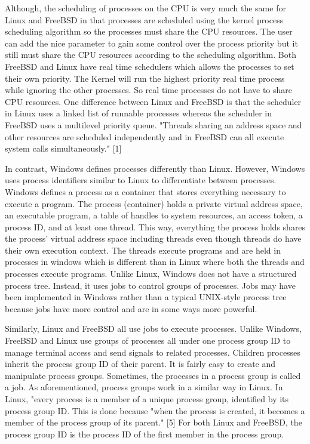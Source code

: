 \documentclass[letterpaper,10pt,onecolumn,draftclsnofoot,]{article}
\begin{document}
Although, the scheduling of processes on the CPU is very much the same for Linux and FreeBSD in that processes are scheduled using the kernel process scheduling algorithm so the processes must share the CPU resources. The user can add the nice parameter to gain some control over the process priority but it still must share the CPU resources according to the scheduling algorithm. Both FreeBSD and Linux have real time schedulers which allows the processes to set their own priority. The Kernel will run the highest priority real time process while ignoring the other processes. So real time processes do not have to share CPU resources. One difference between Linux and FreeBSD is that the scheduler in Linux uses a linked list of runnable processes whereas the scheduler in FreeBSD uses a multilevel priority queue. "Threads sharing an address space and other resources are scheduled independently and in FreeBSD can all execute system calls simultaneously." [1] 

In contrast, Windows defines processes differently than Linux. However, Windows uses process identifiers similar to Linux to differentiate between processes. Windows defines a process as a container that stores everything necessary to execute a program. The process (container) holds a private virtual address space, an executable program, a table of handles to system resources, an access token, a process ID, and at least one thread. This way, everything the process holds shares the process' virtual address space including threads even though threads do have their own execution context. The threads execute programs and are held in processes in windows which is different than in Linux where both the threads and processes execute programs. Unlike Linux, Windows does not have a structured process tree. Instead, it uses jobs to control groups of processes. Jobs may have been implemented in Windows rather than a typical UNIX-style process tree because jobs have more control and are in some ways more powerful.

Similarly, Linux and FreeBSD all use jobs to execute processes. Unlike Windows, FreeBSD and Linux use groups of processes all under one process group ID to manage terminal access and send signals to related processes. Children processes inherit the process group ID of their parent. It is fairly easy to create and manipulate process groups. Sometimes, the processes in a process group is called a job. As aforementioned, process groups work in a similar way in Linux. In Linux, "every process is a member of a unique process group, identified by its process group ID. This is done because "when the process is created, it becomes a member of the process group of its parent." [5] For both Linux and FreeBSD, the process group ID is the process ID of the first member in the process group.
\end{document}
